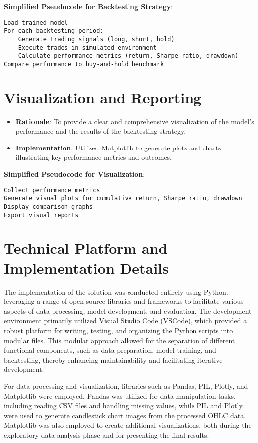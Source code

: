\textbf{Simplified Pseudocode for Backtesting Strategy}:
\begin{verbatim}
Load trained model
For each backtesting period:
    Generate trading signals (long, short, hold)
    Execute trades in simulated environment
    Calculate performance metrics (return, Sharpe ratio, drawdown)
Compare performance to buy-and-hold benchmark
\end{verbatim}

\section{Visualization and Reporting}

\begin{itemize}
    \item \textbf{Rationale}: To provide a clear and comprehensive visualization of the model's performance and the results of the backtesting strategy.
    \item \textbf{Implementation}: Utilized Matplotlib to generate plots and charts illustrating key performance metrics and outcomes.
\end{itemize}

\textbf{Simplified Pseudocode for Visualization}:
\begin{verbatim}
Collect performance metrics
Generate visual plots for cumulative return, Sharpe ratio, drawdown
Display comparison graphs
Export visual reports
\end{verbatim}

\section{Technical Platform and Implementation Details}

The implementation of the solution was conducted entirely using Python, leveraging a range of open-source libraries and frameworks to facilitate various aspects of data processing, model development, and evaluation. The development environment primarily utilized Visual Studio Code (VSCode), which provided a robust platform for writing, testing, and organizing the Python scripts into modular files. This modular approach allowed for the separation of different functional components, such as data preparation, model training, and backtesting, thereby enhancing maintainability and facilitating iterative development.

For data processing and visualization, libraries such as Pandas, PIL, Plotly, and Matplotlib were employed. Pandas was utilized for data manipulation tasks, including reading CSV files and handling missing values, while PIL and Plotly were used to generate candlestick chart images from the processed OHLC data. Matplotlib was also employed to create additional visualizations, both during the exploratory data analysis phase and for presenting the final results.

